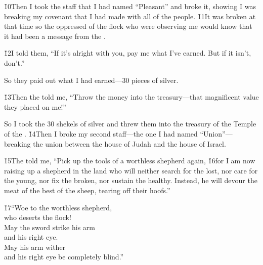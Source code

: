 \v{10}Then I took the staff that I had named ``Pleasant'' and broke it, showing I was breaking my covenant that I had made with all of the people. \v{11}It was broken at that time so the oppressed of the flock who were observing me would know that it had been a message from the .

\v{12}I told them, ``If it's alright with you, pay me what I've earned. But if it isn't, don't.''

So they paid out what I had earned---30 pieces of silver.

\v{13}Then the  told me, ``Throw the money into the treasury---that magnificent value they placed on me!''

So I took the 30 shekels of silver and threw them into the treasury of the Temple of the . \v{14}Then I broke my second staff---the one I had named ``Union''---breaking the union between the house of Judah and the house of Israel.

\v{15}The  told me, ``Pick up the tools of a worthless shepherd again, \v{16}for I am now raising up a shepherd in the land who will neither search for the lost, nor care for the young, nor fix the broken, nor sustain the healthy. Instead, he will devour the meat of the best of the sheep, tearing off their hoofs.''

\begin{poetry}
\poeml \v{17}``Woe to the worthless shepherd, \\
\poemll    who deserts the flock! \\
\poeml May the sword strike his arm \\
\poemll    and his right eye. \\
\poeml May his arm wither \\
\poemll    and his right eye be completely blind.''
\end{poetry}

